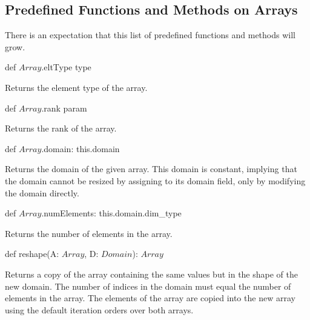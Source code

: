 \subsection{Predefined Functions and Methods on Arrays}

There is an expectation that this list of predefined functions and
methods will grow.

\begin{protohead}
def $Array$.eltType type
\end{protohead}
\begin{protobody}
Returns the element type of the array.
\end{protobody}

\begin{protohead}
def $Array$.rank param
\end{protohead}
\begin{protobody}
Returns the rank of the array.
\end{protobody}

\begin{protohead}
def $Array$.domain: this.domain
\end{protohead}
\begin{protobody}
Returns the domain of the given array.  This domain is constant,
implying that the domain cannot be resized by assigning to its domain
field, only by modifying the domain directly.
\end{protobody}

\begin{protohead}
def $Array$.numElements: this.domain.dim_type
\end{protohead}
\begin{protobody}
Returns the number of elements in the array.
\end{protobody}

\begin{protohead}
def reshape(A: $Array$, D: $Domain$): $Array$
\end{protohead}
\begin{protobody}
Returns a copy of the array containing the same values but in the
shape of the new domain.  The number of indices in the domain must
equal the number of elements in the array.  The elements of the array
are copied into the new array using the default iteration orders over
both arrays.
\end{protobody}
